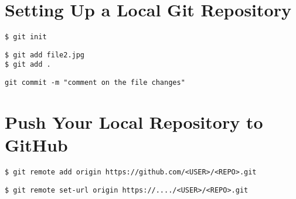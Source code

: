 \documentclass{tufte-handout}
\begin{document}
\section{Setting Up a Local Git Repository}


\begin{shaded}
\begin{verbatim}
$ git init
\end{verbatim}
\end{shaded}

\begin{shaded}
\begin{verbatim}
$ git add file2.jpg
$ git add .
\end{verbatim}
\end{shaded}

\begin{shaded}
\begin{verbatim}
git commit -m "comment on the file changes"
\end{verbatim}
\end{shaded}

\vspace{1cm}

\section{Push Your Local Repository to GitHub}

\begin{shaded}
\begin{verbatim}
$ git remote add origin https://github.com/<USER>/<REPO>.git
\end{verbatim}
\end{shaded}

\begin{shaded}
\begin{verbatim}
$ git remote set-url origin https://..../<USER>/<REPO>.git
\end{verbatim}
\end{shaded}
\end{document}
